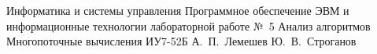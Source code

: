 \makereporttitle
    {Информатика и системы управления}
    {Программное обеспечение ЭВМ и информационные технологии}
    {лабораторной работе №~5}
    {Анализ алгоритмов}
    {Многопоточные вычисления}
    {}
    {ИУ7-52Б}
    {А.~П.~Лемешев}
    {Ю.~В.~Строганов}
    {}